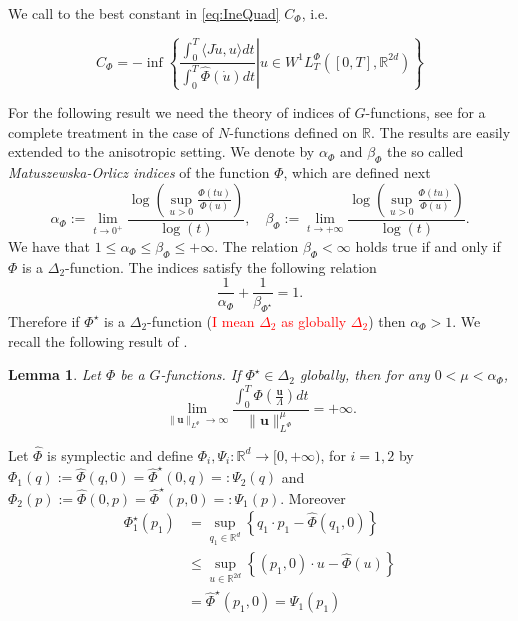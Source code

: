 \documentclass[twoside]{article}
\newtheorem{lem}[thm]{Lemma}
\theoremstyle{remark}
\newcommand{\orlnor}{\|_{L^{\Phi}}}
\newcommand{\lphi}{L^{\Phi}}
\newcommand{\wphit}{W^{1}\lphi_T}
\renewcommand{\b}[1]{\boldsymbol{#1}}
\newcommand{\rr}{\mathbb{R}}
\renewcommand{\leq}{\leqslant}
\newcommand{\Phie}{\Phi^{\star}}
\newcommand{\phih}{\hat{\Phi}}
\newcommand{\phihe}{\hat{\Phi}^\star}
\begin{document}
 We call to the best constant in \eqref{eq:IneQuad} $C_{\Phi}$, i.e.
 
\begin{equation}\label{eq:C-optima}
C_{\Phi}=-\inf\left\{\left.\frac{\int_0^T\langle J\dot{u},u\rangle dt}{\int_0^T\phih(\dot{u})dt}\right|
u\in \wphit([0,T],\rr^{2d})\right\}
 \end{equation}
 
 
For the following result we need the theory of indices of $G$-functions, see \cite{fiorenza1997indices,Maligranda} for a complete treatment in the case of $N$-functions defined on $\rr$. The results are easily extended to the anisotropic setting.
We denote by $\alpha_{\Phi}$ and $\beta_{\Phi}$ the so called  \emph{Matuszewska-Orlicz indices} of the function $\Phi$, which are defined next
\begin{equation}\label{MO_indices}
    \alpha_{\Phi}:=\lim\limits_{t\to 0^{+}}\frac{\log \left (\sup\limits_{u>0}\frac{\Phi(t u)}{\Phi(u)} \right ) }{\log(t)},\quad
    \beta_{\Phi}:=\lim\limits_{t\to +\infty}\frac{\log \left  (\sup\limits_{u>0}\frac{\Phi(t u)}{\Phi(u)}\right )}{\log(t)}.
\end{equation}
We have that $1\leq \alpha_{\Phi}\leq \beta_{\Phi}\leq +\infty$. The relation $\beta_{\Phi}<\infty$ holds true if and only if $\Phi$ is a
$\Delta_2$-function. The indices satisfy the following relation
\begin{equation}\label{inv_indices}
    \frac{1}{\alpha_{\Phi}}+\frac{1}{\beta_{\Phie}}=1.
\end{equation}
Therefore if $\Phie$ is a $\Delta_2$-function (\textcolor{red}{I mean $\Delta_2$ as globally $\Delta_2$}) then $\alpha_{\Phi}>1$. We recall the following result of \cite{ABGMS2015}.

\begin{lem}\label{lem_coer} Let $\Phi$ be a  $G$-functions. If $\Phie \in \Delta_2$ globally, then  for any $0<\mu<\alpha_{\Phi}$,
\begin{equation}\label{coer_modular} \lim\limits_{\|\b{u}\orlnor \to \infty} \frac{\int_0^T\Phi\left(\frac{\b{u}}{\Lambda}\right)dt}{\|\b{u}\orlnor^{\mu}}=+\infty.
\end{equation}

\end{lem}

Let $\phih$ is symplectic and define $\Phi_i,\Psi_i:\rr^d\to [0,+\infty)$, for $i=1,2$ by
$\Phi_1(q):=\phih(q,0)=\phihe(0,q)=:\Psi_2(q)$ and $\Phi_2(p):=\phih(0,p)=\phihe(p,0)=:\Psi_1(p)$. Moreover
\[\begin{split}
   \Phi_1^\star(p_1)&=\sup\limits_{q_1\in\rr^d}\left\{ q_1\cdot p_1-\phih(q_1,0) \right\}\\
   &\leq\sup\limits_{u\in\rr^{2d}}\left\{ (p_1,0)\cdot u-\phih(u) \right\}\\
   &= \phihe(p_1,0)=\Psi_1(p_1)
  \end{split}
\]
\end{document}
